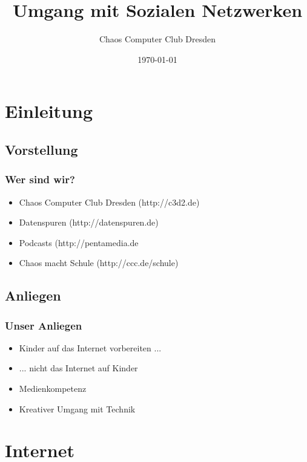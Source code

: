 \documentclass{beamer}
\title{Umgang mit Sozialen Netzwerken}
\author{Chaos Computer Club Dresden}
\date{\today}
\begin{document}
\maketitle

\section{Einleitung}

\subsection{Vorstellung}

\begin{frame}
  \frametitle{Wer sind wir?}
  \begin{itemize}
    \item<1-> Chaos Computer Club Dresden (http://c3d2.de)
      \note{}
    \item<2-> Datenspuren (http://datenspuren.de)
    \item<3-> Podcasts (http://pentamedia.de
    \item<4-> Chaos macht Schule (http://ccc.de/schule)
      \note{}
  \end{itemize}
\end{frame}

\subsection{Anliegen}

\begin{frame}
  \frametitle{Unser Anliegen}
  \begin{itemize}
    \item<1-> Kinder auf das Internet vorbereiten ...
    \item<2-> ... nicht das Internet auf Kinder
    \item<3-> Medienkompetenz
    \item<4-> Kreativer Umgang mit Technik
  \end{itemize}
\end{frame}

\frame{\tableofcontents[hideallsubsections]}

\section{Internet}
\end{document}
